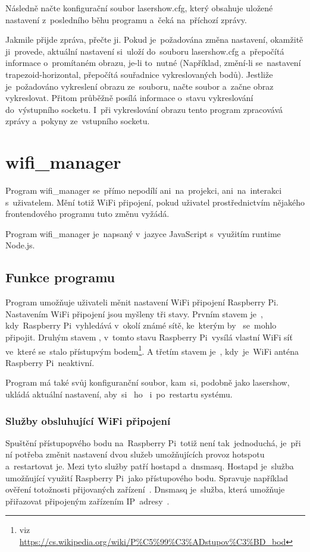 Následně načte konfigurační soubor lasershow.cfg, který obsahuje uložené nastavení  z~posledního běhu programu  a~čeká na~příchozí zprávy.

Jakmile přijde zpráva, přečte ji. Pokud je~požadována změna nastavení, okamžitě ji~provede, aktuální nastavení si~uloží do~souboru lasershow.cfg a~přepočítá informace o~promítaném obrazu, je-li to~nutné (Například, změní-li se~nastavení trapezoid-horizontal, přepočítá souřadnice vykreslovaných bodů).
Jestliže je~požadováno vykreslení obrazu ze~souboru, načte soubor  a~začne obraz vykreslovat.
Přitom průběžně posílá informace o~stavu vykreslování do~výstupního socketu.
I~při vykreslování obrazu tento program zpracovává zprávy a~pokyny ze~vstupního socketu.

\section{wifi\_manager}

Program wifi\_manager se~přímo nepodílí  ani~na~projekci,  ani~na~interakci s~uživatelem. Mění totiž WiFi připojení, pokud uživatel prostřednictvím nějakého frontendového programu tuto změnu vyžádá.

Program wifi\_manager je~napsaný v~jazyce JavaScript s~využitím runtime Node.js.

\subsection{Funkce programu}
Program umožňuje uživateli měnit nastavení WiFi připojení Raspberry Pi. Nastavením WiFi připojení jsou myšleny tři stavy.
Prvním stavem je~,  kdy~Raspberry Pi~vyhledává  v~okolí známé sítě, ke~kterým by ~se~mohlo připojit.
Druhým stavem ,  v~tomto stavu Raspberry Pi~vysílá vlastní WiFi síť ve~které se~stalo přístupvým bodem\footnote{viz \url{https://cs.wikipedia.org/wiki/P\%C5\%99\%C3\%ADstupov\%C3\%BD\_bod}}.
A třetím stavem je~,  kdy~je~WiFi anténa Raspberry Pi~neaktivní.

Program má také svůj konfiguranční soubor,  kam~si, podobně jako lasershow, ukládá aktuální nastavení,  aby~si ~ho~  i~po~restartu systému.

\subsubsection{Služby obsluhující WiFi připojení}
Spuštění přístupopvého bodu na~Raspberry Pi~totiž není  tak~jednoduchá, je~při ní potřeba změnit nastavení dvou služeb umožňujících provoz hotspotu  a~restartovat je. Mezi tyto služby patří hostapd  a~dnsmasq.
Hostapd je~služba umožňující využití Raspberry Pi~jako přístupového bodu. Spravuje například ověření totožnosti přijovaných zařízení~\cite{hostapd}. Dnsmasq je~služba, která umožňuje přiřazovat připojeným zařízením IP~adresy~\cite{dnsmasq}.

